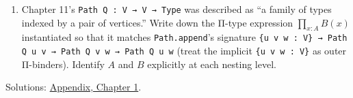 \begin{enumerate}
\item
  Chapter 11's \texttt{Path Q : V → V → Type} was described as ``a family of types indexed by a pair of vertices.'' Write down the Π-type expression \(\prod_{x:A} B(x)\) instantiated so that it matches \texttt{Path.append}'s signature \texttt{\{u v w : V\} → Path Q u v → Path Q v w → Path Q u w} (treat the implicit \texttt{\{u v w : V\}} as outer Π-binders). Identify \(A\) and \(B\) explicitly at each nesting level.
\end{enumerate}

Solutions: \hyperref[sec:14-appendix-solutions:01-chapter-1:1]{Appendix, Chapter 1}.
